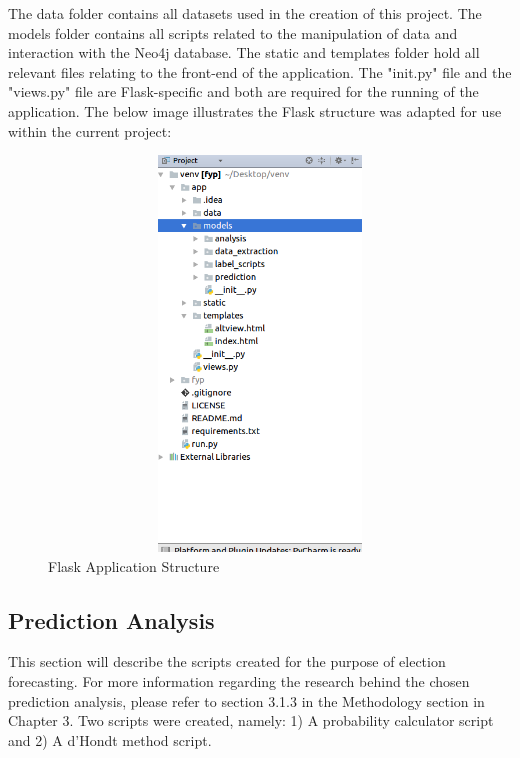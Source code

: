 The data folder contains all datasets used in the creation of this project. The models folder contains all scripts related to the manipulation of data and interaction with the Neo4j database. The static and templates folder hold all relevant files relating to the front-end of the application. The "\textunderscore \textunderscore init.py\textunderscore \textunderscore" file and the "views.py" file are Flask-specific and both are required for the running of the application.  The below image illustrates the Flask structure was adapted for use within the current project:

\begin{figure}[h]
	\caption{Flask Application Structure}
	\centering
	\includegraphics[width=15cm, height=10.5cm]{img/flask}
\end{figure}
\pagebreak

\subsection{Prediction Analysis}	
This section will describe the scripts created for the purpose of election forecasting. For more information regarding the research behind the chosen prediction analysis, please refer to section 3.1.3 in the Methodology section in Chapter 3. Two scripts were created, namely: 1) A probability calculator script and 2) A d’Hondt method script. 

